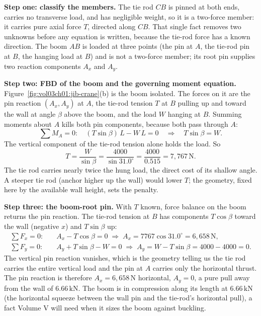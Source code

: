 \textbf{Step one: classify the members.} The tie rod $CB$ is pinned at
both ends, carries no transverse load, and has negligible weight, so it is
a two-force member: it carries pure axial force $T$, directed along $CB$.
That single fact removes two unknowns before any equation is written,
because the tie-rod force has a known direction. The boom $AB$ is loaded
at three points (the pin at $A$, the tie-rod pin at $B$, the hanging load
at $B$) and is not a two-force member; its root pin supplies two reaction
components $A_x$ and $A_y$.

\textbf{Step two: FBD of the boom and the governing moment equation.}
Figure~\ref{fig:vol03ch01:jib-crane}(b) is the boom isolated. The forces
on it are the pin reaction $(A_x, A_y)$ at $A$, the tie-rod tension $T$ at
$B$ pulling up and toward the wall at angle $\beta$ above the boom, and the
load $W$ hanging at $B$. Summing moments about $A$ kills both pin
components, because both pass through $A$:
\[
\sum M_A = 0: \quad (T\sin\beta)\,L - W\,L = 0
\quad\Longrightarrow\quad T\sin\beta = W.
\]
The vertical component of the tie-rod tension alone holds the load. So
\[
T = \frac{W}{\sin\beta} = \frac{4000}{\sin 31.0^{\circ}}
= \frac{4000}{0.515} = 7{,}767\,\text{N}.
\]
The tie rod carries nearly twice the hung load, the direct cost of its
shallow angle. A steeper tie rod (anchor higher up the wall) would lower
$T$; the geometry, fixed here by the available wall height, sets the
penalty.

\textbf{Step three: the boom-root pin.} With $T$ known, force balance on
the boom returns the pin reaction. The tie-rod tension at $B$ has
components $T\cos\beta$ toward the wall (negative $x$) and $T\sin\beta$ up:
\begin{align*}
\sum F_x = 0: & \quad A_x - T\cos\beta = 0
  \;\Rightarrow\; A_x = 7767\cos 31.0^{\circ} = 6{,}658\,\text{N}, \\
\sum F_y = 0: & \quad A_y + T\sin\beta - W = 0
  \;\Rightarrow\; A_y = W - T\sin\beta = 4000 - 4000 = 0.
\end{align*}
The vertical pin reaction vanishes, which is the geometry telling us the
tie rod carries the entire vertical load and the pin at $A$ carries only
the horizontal thrust. The pin reaction is therefore $A_x = 6{,}658\,
\text{N}$ horizontal, $A_y = 0$, a pure pull away from the wall of $6.66\,
\text{kN}$. The boom is in compression along its length at $6.66\,
\text{kN}$ (the horizontal squeeze between the wall pin and the tie-rod's
horizontal pull), a fact Volume V will need when it sizes the boom against
buckling.


